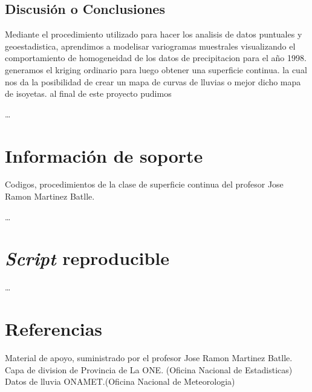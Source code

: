 \documentclass[11pt,]{article}
\begin{document}
\subsection{Discusión o Conclusiones}\label{discusiuxf3n-o-conclusiones}

Mediante el procedimiento utilizado para hacer los analisis de datos
puntuales y geoestadistica, aprendimos a modelisar variogramas
muestrales visualizando el comportamiento de homogeneidad de los datos
de precipitacion para el año 1998. generamos el kriging ordinario para
luego obtener una superficie continua. la cual nos da la posibilidad de
crear un mapa de curvas de lluvias o mejor dicho mapa de isoyetas. al
final de este proyecto pudimos

\ldots

\section{Información de soporte}\label{informaciuxf3n-de-soporte}

Codigos, procedimientos de la clase de superficie continua del profesor
Jose Ramon Martinez Batlle.

\ldots

\section{\texorpdfstring{\emph{Script}
reproducible}{Script reproducible}}\label{script-reproducible}

\ldots

\section{Referencias}\label{referencias}

Material de apoyo, suministrado por el profesor Jose Ramon Martinez
Batlle. Capa de division de Provincia de La ONE. (Oficina Nacional de
Estadisticas) Datos de lluvia ONAMET.(Oficina Nacional de Meteorologia)




\newpage
\singlespacing 
\end{document}
